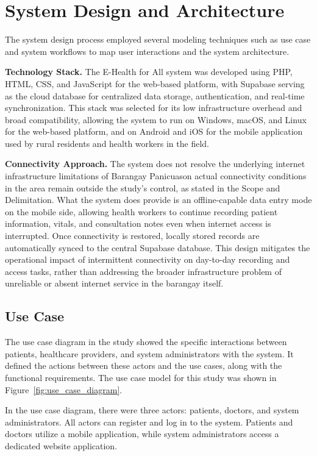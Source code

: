 \documentclass{research}
\begin{document}
\section{System Design and Architecture}

The system design process employed several modeling techniques such as use case and system workflows to map user interactions and the system architecture.

\textbf{Technology Stack.} The E-Health for All system was developed using PHP, HTML, CSS, and JavaScript for the web-based platform, with Supabase serving as the cloud database for centralized data storage, authentication, and real-time synchronization. This stack was selected for its low infrastructure overhead and broad compatibility, allowing the system to run on Windows, macOS, and Linux for the web-based platform, and on Android and iOS for the mobile application used by rural residents and health workers in the field.

\textbf{Connectivity Approach.} The system does not resolve the underlying internet infrastructure limitations of Barangay Panicuason actual connectivity conditions in the area remain outside the study's control, as stated in the Scope and Delimitation. What the system does provide is an offline-capable data entry mode on the mobile side, allowing health workers to continue recording patient information, vitals, and consultation notes even when internet access is interrupted. Once connectivity is restored, locally stored records are automatically synced to the central Supabase database. This design mitigates the operational impact of intermittent connectivity on day-to-day recording and access tasks, rather than addressing the broader infrastructure problem of unreliable or absent internet service in the barangay itself.

\subsection*{Use Case}

The use case diagram in the study showed the specific interactions between patients, 
healthcare providers, and system administrators with the system. It defined the actions 
between these actors and the use cases, along with the functional requirements. The use 
case model for this study was shown in Figure~\ref{fig:use_case_diagram}.

In the use case diagram, there were three actors: patients, doctors, and system 
administrators. All actors can register and log in to the system. Patients and doctors 
utilize a mobile application, while system administrators access a dedicated website 
application.
\end{document}
